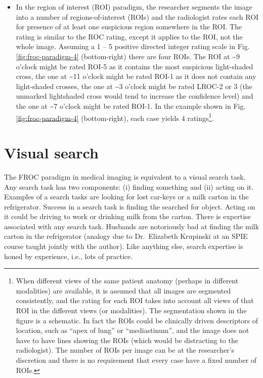 \documentclass[
]{book}
\begin{document}
\begin{itemize}
\item
  In the region of interest (ROI) paradigm, the researcher segments the image into a number of regions-of-interest (ROIs) and the radiologist rates each ROI for presence of at least one suspicious region somewhere in the ROI. The rating is similar to the ROC rating, except it applies to the ROI, not the whole image. Assuming a 1 -- 5 positive directed integer rating scale in Fig. \ref{fig:froc-paradigm-4} (bottom-right) there are four ROIs. The ROI at \textasciitilde9 o'clock might be rated ROI-5 as it contains the most suspicious light-shaded cross, the one at \textasciitilde11 o'clock might be rated ROI-1 as it does not contain any light-shaded crosses, the one at \textasciitilde3 o'clock might be rated LROC-2 or 3 (the unmarked lightshaded cross would tend to increase the confidence level) and the one at \textasciitilde7 o'clock might be rated ROI-1. In the example shown in Fig. \ref{fig:froc-paradigm-4} (bottom-right), each case yields 4 ratings\footnote{When different views of the same patient anatomy (perhaps in different modalities) are available, it is assumed that all images are segmented consistently, and the rating for each ROI takes into account all views of that ROI in the different views (or modalities). The segmentation shown in the figure is a schematic. In fact the ROIs could be clinically driven descriptors of location, such as ``apex of lung'' or ``mediastinum'', and the image does not have to have lines showing the ROIs (which would be distracting to the radiologist). The number of ROIs per image can be at the researcher's discretion and there is no requirement that every case have a fixed number of ROIs.}.
\end{itemize}

\hypertarget{froc-paradigm-vis-search}{%
\section{Visual search}\label{froc-paradigm-vis-search}}

The FROC paradigm in medical imaging is equivalent to a visual search task. Any search task has two components: (i) finding something and (ii) acting on it. Examples of a search tasks are looking for lost car-keys or a milk carton in the refrigerator. Success in a search task is finding the searched for object. Acting on it could be driving to work or drinking milk from the carton. There is expertise associated with any search task. Husbands are notoriously bad at finding the milk carton in the refrigerator (analogy due to Dr.~Elizabeth Krupinski at an SPIE course taught jointly with the author). Like anything else, search expertise is honed by experience, i.e., lots of practice.
\end{document}
